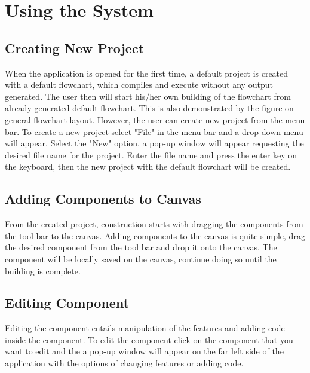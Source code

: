 \documentclass[11pt,a4paper,titlepage]{article}
\begin{document}
\begin{itemize}
			
		\end{itemize}

	\newpage
	
	
	
	
	
	
\section{Using the System}
	\subsection{Creating New Project}
	
	When the application is opened for the first time, a default project is created with a default flowchart, which compiles and execute without any output generated. The user then will start his/her own building of the flowchart from already generated default flowchart. This is also demonstrated by the figure on general flowchart layout. \newline\newline
However, the user can create new project from the menu bar. To create a new project select "File" in the menu bar and a drop down menu will appear. Select the "New" option, a pop-up window will appear requesting the desired file name for the project. Enter the file name and press the enter key on the keyboard, then the new project with the default flowchart will be created. \newline
		
		
	\subsection{Adding Components to Canvas}
	
	From the created project, construction starts with dragging the components from the tool bar to the canvas. Adding components to the canvas is quite simple, drag the desired component from the tool bar and drop it onto the canvas. The component will be locally saved on the canvas, continue doing so until the building is complete.
	
	\subsection{Editing Component}
	
	Editing the component entails manipulation of the features and adding code inside the component. To edit the component click on the component that you want to edit and the a pop-up window will appear on the far left side of the application with the options of changing features or adding code.
		
\end{document}
